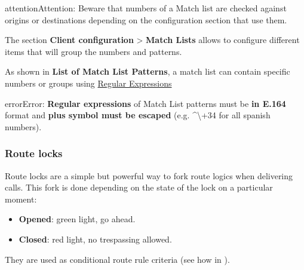 \documentclass[letterpaper,10pt,english]{sphinxmanual}
\begin{document}
\begin{notice}{attention}{Attention:}
Beware that numbers of a Match list are checked against origins
or destinations depending on the configuration section that use them.
\end{notice}

The section \textbf{Client configuration} \textgreater{} \textbf{Match Lists} allows to configure
different items that will group the numbers and patterns.

As shown in \textbf{List of Match List Patterns}, a match list can contain specific numbers or groups using
\href{http://php.net/manual/en/reference.pcre.pattern.syntax.php}{Regular Expressions}

\begin{notice}{error}{Error:}
\textbf{Regular expressions} of Match List patterns must be \textbf{in E.164} format and \textbf{plus symbol must be
escaped} (e.g. \textasciicircum{}\textbackslash{}+34 for all spanish numbers).
\end{notice}
\label{administration_portal/client/vpbx/routing_tools/route_locks:route-locks}

\subsubsection{Route locks}
\label{administration_portal/client/vpbx/routing_tools/route_locks:id2}\label{administration_portal/client/vpbx/routing_tools/route_locks:route-locks}\label{administration_portal/client/vpbx/routing_tools/route_locks::doc}\label{administration_portal/client/vpbx/routing_tools/route_locks:id1}
Route locks are a simple but powerful way to fork route logics when delivering calls. This fork is done depending on the
state of the lock on a particular moment:
\begin{itemize}
\item {} 
\textbf{Opened}: green light, go ahead.

\item {} 
\textbf{Closed}: red light, no trespassing allowed.

\end{itemize}

They are used as conditional route rule criteria (see how in {\hyperref[administration_portal/client/vpbx/routing_endpoints/conditional_routes:conditional\string-routes]{}}).
\end{document}
